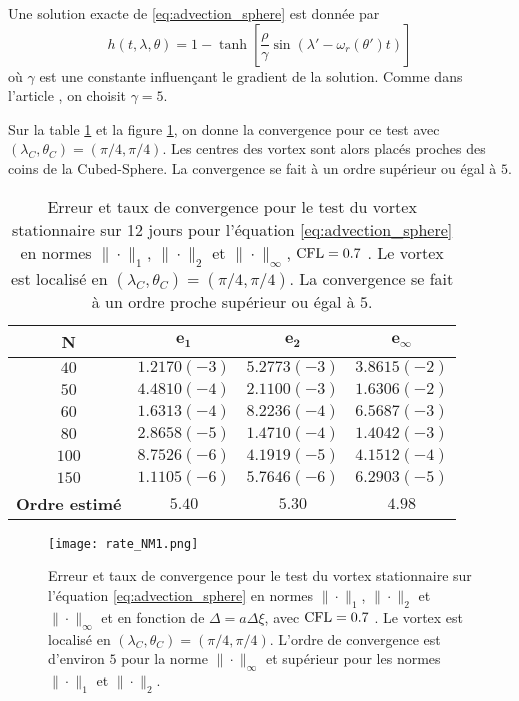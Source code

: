 Une solution exacte de \eqref{eq:advection_sphere} est donnée par
\begin{equation}
h(t, \lambda, \theta) = 1 - \tanh \left[ \dfrac{\rho}{\gamma} \sin (\lambda' - \omega_r (\theta') t) \right]
\label{eq:NM_solexacte}
\end{equation}
où $\gamma$ est une constante influençant le gradient de la solution. Comme dans l'article \cite{Nair2002}, on choisit $\gamma = 5$.

Sur la table \ref{tab:rate1_NM} et la figure \ref{fig:rate1_NM}, on donne la convergence pour ce test avec $(\lambda_C, \theta_C)=(\pi /4 , \pi /4)$. Les centres des vortex sont alors placés proches des coins de la Cubed-Sphere. La convergence se fait à un ordre supérieur ou égal à $5$.

\begin{table}[htbp]
\begin{center}
\begin{tabular}{|c||c|c|c|}
\hline
\textbf{N}  & $\mathbf{e_1}$ & $\mathbf{e_2}$ & $\mathbf{e_{\infty}}$\\
\hline
\hline
$40$  & $1.2170 (-3)$ & $5.2773 (-3)$ & $3.8615 (-2)$ \\
$50$  & $4.4810 (-4)$ & $2.1100 (-3)$ & $1.6306 (-2)$ \\
$60$  & $1.6313 (-4)$ & $8.2236 (-4)$ & $6.5687 (-3)$ \\
$80$  & $2.8658 (-5)$ & $1.4710 (-4)$ & $1.4042 (-3)$ \\
$100$  & $8.7526 (-6)$ & $4.1919 (-5)$ & $4.1512 (-4)$ \\
$150$  & $1.1105 (-6)$ & $5.7646 (-6)$ & $6.2903 (-5)$ \\
\hline 
\hline
\textbf{Ordre estimé}& $5.40$ & $5.30$ & $4.98$\\
\hline
\end{tabular}
\end{center}
\caption{Erreur et taux de convergence pour le test du vortex stationnaire sur 12 jours pour l'équation \eqref{eq:advection_sphere} en normes $\| \cdot\|_1$, $\| \cdot\|_2$ et $\| \cdot\|_{\infty}$, $\text{CFL} = 0.7$ \cite{Nair2002}. Le vortex est localisé en $(\lambda_C, \theta_C)=(\pi /4 , \pi /4)$. La convergence se fait à un ordre proche supérieur ou égal à $5$.}
\label{tab:rate1_NM}
\end{table} 

\begin{figure}[htbp]
\begin{center}
\texttt{[image: rate\_NM1.png]}
\end{center}
\caption{Erreur et taux de convergence pour le test du vortex stationnaire sur l'équation \eqref{eq:advection_sphere} en normes $\| \cdot\|_1$, $\| \cdot\|_2$ et $\| \cdot\|_{\infty}$ et en fonction de $\Delta = a \Delta \xi$, avec $\text{CFL} = 0.7$ \cite{Nair2002}. Le vortex est localisé en $(\lambda_C, \theta_C)=(\pi /4 , \pi /4)$. L'ordre de convergence est d'environ $5$ pour la norme $\| \cdot \|_{\infty}$ et supérieur pour les normes $\| \cdot \|_{1}$ et $\| \cdot \|_{2}$.}
\label{fig:rate1_NM}
\end{figure} 


